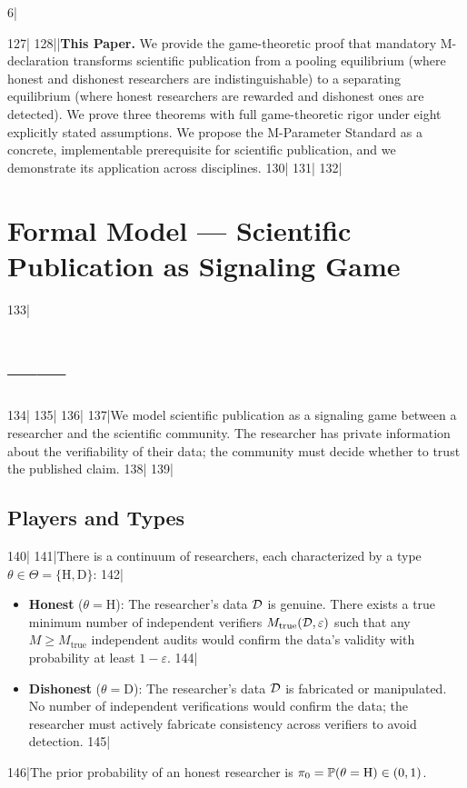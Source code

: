 6|\documentclass[12pt,a4paper]{article}
\begin{document}
127|
128||\noindent\textbf{This Paper.} We provide the game-theoretic proof that mandatory M-declaration transforms scientific publication from a pooling equilibrium (where honest and dishonest researchers are indistinguishable) to a separating equilibrium (where honest researchers are rewarded and dishonest ones are detected). We prove three theorems with full game-theoretic rigor under eight explicitly stated assumptions. We propose the M-Parameter Standard as a concrete, implementable prerequisite for scientific publication, and we demonstrate its application across disciplines.
130|
131|%
132|\section{Formal Model — Scientific Publication as Signaling Game}
133|\section{——}
134|\label{sec:model}
135|%
136|
137|We model scientific publication as a signaling game between a researcher and the scientific community. The researcher has private information about the verifiability of their data; the community must decide whether to trust the published claim.
138|
139|\subsection{Players and Types }
140|
141|There is a continuum of researchers, each characterized by a type $\theta \in \Theta = \{\text{H}, \text{D}\}$:
142|\begin{itemize}[nosep]
143|    \item \textbf{Honest} ($\theta = \text{H}$): The researcher's data $\mathcal{D}$ is genuine. There exists a true minimum number of independent verifiers $M_{\text{true}}(\mathcal{D}, \varepsilon)$ such that any $M \ge M_{\text{true}}$ independent audits would confirm the data's validity with probability at least $1-\varepsilon$.
144|    \item \textbf{Dishonest} ($\theta = \text{D}$): The researcher's data $\mathcal{D}$ is fabricated or manipulated. No number of independent verifications would confirm the data; the researcher must actively fabricate consistency across verifiers to avoid detection.
145|\end{itemize}
146|The prior probability of an honest researcher is $\pi_0 = \mathbb{P}(\theta = \text{H}) \in (0,1)$.
\end{document}
